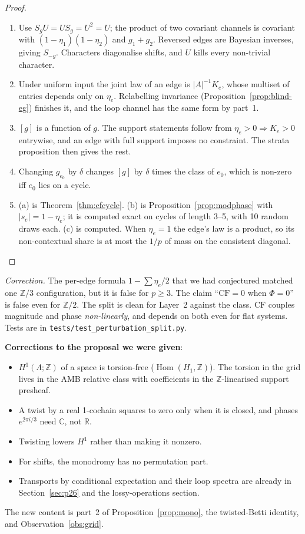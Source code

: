 \documentclass[11pt]{article}
\theoremstyle{definition}
\theoremstyle{remark}
\newcommand{\Z}{\mathbb{Z}}
\newcommand{\R}{\mathbb{R}}
\newcommand{\CF}{\mathrm{CF}}
\begin{document}
\begin{proof}
\begin{enumerate}
  \item Use $S_gU=US_g=U^2=U$; the product of two covariant channels is covariant with $(1-\eta_1)(1-\eta_2)$ and $g_1+g_2$. Reversed edges are Bayesian inverses, giving $S_{-g}$. Characters diagonalise shifts, and $U$ kills every non-trivial character.
  \item Under uniform input the joint law of an edge is $|A|^{-1}K_e$, whose multiset of entries depends only on $\eta_e$. Relabelling invariance (Proposition~\ref{prop:blind-eg}) finishes it, and the loop channel has the same form by part~1.
  \item $[g]$ is a function of $g$. The support statements follow from $\eta_e>0\Rightarrow K_e>0$ entrywise, and an edge with full support imposes no constraint. The strata proposition then gives the rest.
  \item Changing $g_{e_0}$ by $\delta$ changes $[g]$ by $\delta$ times the class of $e_0$, which is non-zero iff $e_0$ lies on a cycle.
  \item (a) is Theorem~\ref{thm:cfcycle}. (b) is Proposition~\ref{prop:modphase} with $|s_e|=1-\eta_e$; it is computed exact on cycles of length 3--5, with 10 random draws each. (c) is computed. When $\eta_e=1$ the edge's law is a product, so its non-contextual share is at most the $1/p$ of mass on the consistent diagonal.
\end{enumerate}
\end{proof}
\noindent\emph{Correction.} The per-edge formula $1-\sum\eta_e/2$ that we had conjectured matched one $\Z/3$ configuration, but it is false for $p\ge3$. The claim ``$\CF=0$ when $\Phi=0$'' is false even for $\Z/2$. The split is clean for Layer~2 against the class. $\CF$ couples magnitude and phase \emph{non-linearly}, and depends on both even for flat systems. Tests are in \texttt{tests/test\_perturbation\_split.py}.

\noindent\textbf{Corrections to the proposal we were given}:
\begin{itemize}
  \item $H^1(\Lambda;\Z)$ of a space is torsion-free ($\operatorname{Hom}(H_1,\Z)$). The torsion in the grid lives in the AMB relative class with coefficients in the $\Z$-linearised support presheaf.
  \item A twist by a real 1-cochain squares to zero only when it is closed, and phases $e^{2\pi i/3}$ need $\mathbb C$, not $\R$.
  \item Twisting lowers $H^1$ rather than making it nonzero.
  \item For shifts, the monodromy has no permutation part.
  \item Transports by conditional expectation and their loop spectra are already in Section~\ref{sec:p26} and the lossy-operations section.
\end{itemize}
The new content is part~2 of Proposition~\ref{prop:mono}, the twisted-Betti identity, and Observation~\ref{obs:grid}.
\end{document}
